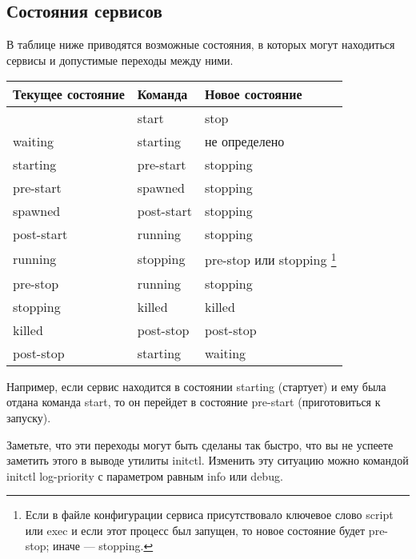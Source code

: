 \subsection{Состояния сервисов}

В таблице ниже приводятся возможные состояния, в которых могут находиться сервисы и допустимые переходы между ними.
\begin{table}[h]
\begin{tabular}{|l|l|l|}
    \hline Текущее состояние &  Команда & Новое состояние \\ 
\hline  & start & stop \\ 
\hline waiting & starting & не определено \\ 
\hline starting & pre-start & stopping \\ 
\hline pre-start & spawned & stopping \\ 
\hline spawned & post-start & stopping \\ 
\hline post-start & running & stopping \\
\hline running & stopping & pre-stop или stopping \footnote{Если в файле конфигурации сервиса присутствовало ключевое слово script или exec и если этот процесс был запущен, то новое состояние будет pre-stop; иначе --- stopping.} \\
\hline pre-stop & running & stopping \\
\hline stopping & killed & killed \\
\hline killed & post-stop & post-stop \\
\hline post-stop & starting & waiting \\
\hline
\end{tabular} 
\end{table}
Например, если сервис находится в состоянии starting (стартует) и ему была отдана команда start, то он перейдет в состояние pre-start (приготовиться к запуску).

Заметьте, что эти переходы могут быть сделаны так быстро, что вы не успеете заметить этого в выводе утилиты initctl. Изменить эту ситуацию можно командой initctl log-priority с параметром равным info
или debug.

